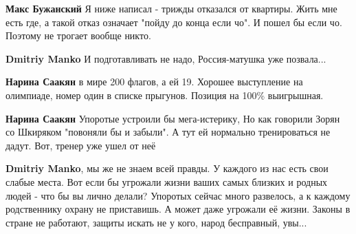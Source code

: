 \begin{itemize}
\begin{itemize}
\textbf{Макс Бужанский} Я ниже написал - трижды отказался от квартиры. Жить мне есть где, а такой отказ означает "пойду до конца если чо". И пошел бы если чо. Поэтому не трогает вообще никто.

 
\textbf{Dmitriy Manko} И подготавливать не надо, Россия-матушка уже позвала...🤣

 
\textbf{Нарина Саакян} в мире 200 флагов, а ей 19. Хорошее выступление на олимпиаде, номер один в списке прыгунов. Позиция на 100\% выигрышная.

 
\textbf{Нарина Саакян} Упоротые устроили бы мега-истерику, Но как говорили
Зорян со Шкиряком "повоняли бы и забыли". А тут ей нормально тренироваться не
дадут. Вот, тренер уже ушел от неё

 
\textbf{Dmitriy Manko}, мы же не знаем всей правды. У каждого из нас есть свои
слабые места. Вот если бы угрожали жизни ваших самых близких и родных людей -
что бы вы лично делали? Упоротых сейчас много развелось, а к каждому
родственнику охрану не приставишь. А может даже угрожали её жизни. Законы в
стране не работают, защиты искать не у кого, народ бесправный, увы...
\end{itemize}

 

\end{itemize}
